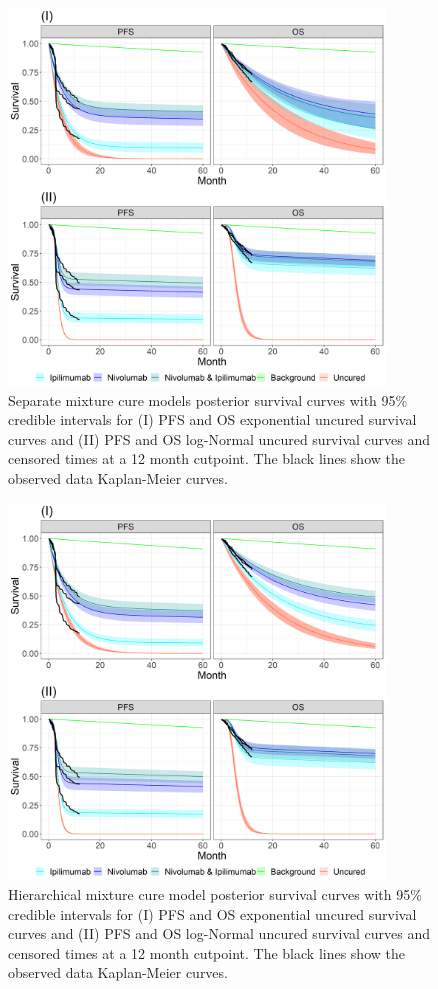 \documentclass[AMA,STIX1COL]{WileyNJD-v2}
\begin{document}

\begin{figure}[!ht]
\centering
\includegraphics[height=10cm, width=0.6\linewidth]{plot_S_grid_cf_sep_cpt_12m.png}
\caption{\label{fig:S_cutpoint_12mo_sep} Separate mixture cure models posterior survival curves with 95\% credible intervals for (I) PFS and OS exponential uncured survival curves and (II) PFS and OS log-Normal uncured survival curves and censored times at a 12 month cutpoint. The black lines show the observed data Kaplan-Meier curves.}
\end{figure}

\begin{figure}[!ht]
\centering
\includegraphics[height=10cm, width=0.6\linewidth]{plot_S_grid_cf_hier_cpt_12m.png}
\caption{\label{fig:S_cutpoint_12mo_hier} Hierarchical mixture cure model posterior survival curves with 95\% credible intervals for (I) PFS and OS exponential uncured survival curves and (II) PFS and OS log-Normal uncured survival curves and censored times at a 12 month cutpoint. The black lines show the observed data Kaplan-Meier curves.}
\end{figure}
\end{document}

